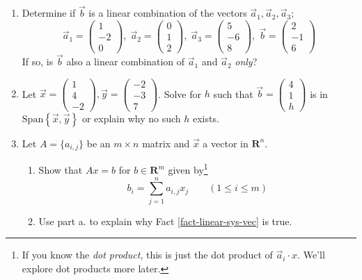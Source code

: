 \documentclass[12pt]{article}
\numberwithin{equation}{subsection}
\numberwithin{figure}{subsection}
\theoremstyle{note}
\newcommand\Span[1]{\mathrm{Span}\left\{#1\right\}}
\begin{document}
\begin{enumerate}[label=\arabic*.]
	\item Determine if $\vec{b}$ is a linear combination of the vectors $\vec{a}_1, \vec{a}_2, \vec{a}_3$; \[ \vec{a}_1 = \begin{pmatrix} 1 \\ -2 \\ 0 \end{pmatrix}, \; \vec{a}_2 = \begin{pmatrix} 0 \\ 1 \\ 2 \end{pmatrix}, \; \vec{a}_3 = \begin{pmatrix} 5 \\ -6 \\ 8 \end{pmatrix}, \; \vec{b} = \begin{pmatrix} 2 \\ -1 \\ 6 \end{pmatrix}\]
	If so, is $\vec{b}$ also a linear combination of $\vec{a}_1$ and $\vec{a}_2$ \textit{only}?


	
	\item Let $\vec{x} = \begin{pmatrix} 1 \\ 4 \\ -2 \end{pmatrix}, \vec{y}= \begin{pmatrix} -2 \\ -3 \\ 7 \end{pmatrix}$. Solve for $h$ such that $\vec{b}=\begin{pmatrix} 4 \\ 1 \\ h \end{pmatrix}$ is in $\Span{\vec{x}, \vec{y}}$ or explain why no such $h$ exists. 
	\item Let $A=\{a_{i,j}\}$ be an $m\times n$ matrix and $\vec{x}$ a vector in $\mathbf{R}^n$. 
	\begin{enumerate}
	\item Show that $Ax=b$ for $b\in\mathbf{R}^m$ given by\footnote{If you know the \textit{dot product}, this is just the dot product of $\vec{a}_i\cdot x$. We'll explore dot products more later.} \[ b_i=\sum_{j=1}^n a_{i,j}x_j \qquad (1\leq i \leq m)\]
	\item Use part a. to explain why Fact \ref{fact-linear-sys-vec} is true. 
	\end{enumerate}
	

\end{enumerate}
\end{document}
